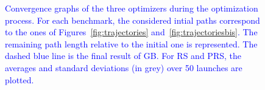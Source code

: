 \documentclass{tADR2e}
\begin{document}
\begin{figure}
{		\label{fig:remainingLengthComp:pr2alone}
	}
  \caption{\textcolor{blue}{Convergence graphs of the three optimizers during the optimization process. For each benchmark, the considered intial paths correspond to the ones of Figures~\ref{fig:trajectories} and~\ref{fig:trajectoriesbis}. The remaining path length relative to the initial one is represented. The dashed blue line is the final result of GB. For RS and PRS, the averages and standard deviations (in grey) over 50 launches are plotted.}}
  \label{fig:remainingLength}
\end{figure}




\end{document}

